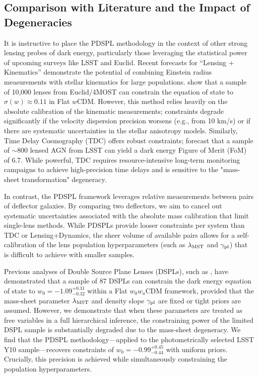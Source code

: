 \documentclass[a4paper,11pt]{article}
\begin{document}
\subsection{Comparison with Literature and the Impact of Degeneracies}
It is instructive to place the PDSPL methodology in the context of other strong lensing probes of dark energy, particularly those leveraging the statistical power of upcoming surveys like LSST and Euclid. Recent forecasts for ``Lensing + Kinematics'' demonstrate the potential of combining Einstein radius measurements with stellar kinematics for large populations. \cite{Li:2024} show that a sample of 10,000 lenses from Euclid/4MOST can constrain the equation of state to $\sigma(w) \approx 0.11$ in Flat $w$CDM. However, this method relies heavily on the absolute calibration of the kinematic measurements; constraints degrade significantly if the velocity dispersion precision worsens (e.g., from 10 km/s) or if there are systematic uncertainties in the stellar anisotropy models. Similarly, Time Delay Cosmography (TDC) offers robust constraints; \cite{Erickson:2025} forecast that a sample of $\sim800$ lensed AGN from LSST can yield a dark energy Figure of Merit (FoM) of 6.7. While powerful, TDC requires resource-intensive long-term monitoring campaigns to achieve high-precision time delays and is sensitive to the "mass-sheet transformation" degeneracy.

In contrast, the PDSPL framework leverages relative measurements between pairs of deflector galaxies. By comparing two deflectors, we aim to cancel out systematic uncertainties associated with the absolute mass calibration that limit single-lens methods. While PDSPLs provide looser constraints per system than TDC or Lensing+Dynamics, the sheer volume of available pairs allows for a self-calibration of the lens population hyperparameters (such as $\lambda_{\rm MST}$ and $\gamma_{\rm pl}$) that is difficult to achieve with smaller samples.

Previous analyses of Double Source Plane Lenses (DSPLs), such as \cite{Divij:2023}, have demonstrated that a sample of 87 DSPLs can constrain the dark energy equation of state to $w_0 = -1.09_{-0.32}^{+0.31}$ within a Flat $w_0w_a$CDM framework, provided that the mass-sheet parameter $\lambda_{\rm MST}$ and density slope $\gamma_{\rm pl}$ are fixed or tight priors are assumed. However, we demonstrate that when these parameters are treated as free variables in a full hierarchical inference, the constraining power of the limited DSPL sample is substantially degraded due to the mass-sheet degeneracy. We find that the PDSPL methodology—applied to the photometrically selected LSST Y10 sample—recovers constraints of $w_0 = -0.99^{+0.45}_{-0.44}$ with uniform priors. Crucially, this precision is achieved while simultaneously constraining the population hyperparameters.
\end{document}
